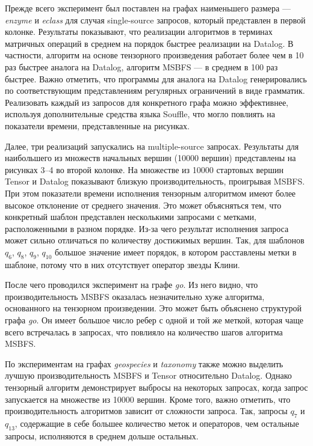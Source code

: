 Прежде всего эксперимент был поставлен на графах наименьшего размера --- \textit{enzyme} и \textit{eclass} для случая single-source запросов, который представлен в первой колонке. Результаты показывают, что реализации алгоритмов в терминах матричных операций в среднем на порядок быстрее реализации на Datalog. В частности, алгоритм на основе тензорного произведения работает более чем в 10 раз быстрее аналога на Datalog, алгоритм MSBFS --- в среднем в 100 раз быстрее. Важно отметить, что программы для аналога на Datalog генерировались по соответствующим представлениям регулярных ограничений в виде грамматик. Реализовать каждый из запросов для конкретного графа можно эффективнее, используя дополнительные средства языка Souffle, что могло повлиять на показатели времени, представленные на рисунках.

Далее, три реализаций запускались на multiple-source запросах. Результаты для наибольшего из множеств начальных вершин (10000 вершин) представлены на рисунках 3--4 во второй колонке. На множестве из 10000 стартовых вершин Tensor и Datalog показывают близкую производительность, проигрывая MSBFS. При этом показатели времени исполнения тензорным алгоритмом имеют более высокое отклонение от среднего значения. Это может объясняться тем, что конкретный шаблон представлен несколькими запросами с метками, расположенными в разном порядке. Из-за чего результат исполнения запроса может сильно отличаться по количеству достижимых вершин. Так, для шаблонов $q_6$, $q_8$, $q_9$, $q_{10}$ большое значение имеет порядок, в котором расставлены метки в шаблоне, потому что в них отсутствует оператор звезды Клини.

После чего проводился эксперимент на графе \textit{go}. Из него видно, что производительность MSBFS оказалась незначительно хуже алгоритма, основанного на тензорном произведении. Это может быть объяснено структурой графа \textit{go}. Он имеет большое число ребер с одной и той же меткой, которая чаще всего встречалась в запросах, что повлияло на количество шагов алгоритма MSBFS.

По экспериментам на графах \textit{geospecies} и \textit{taxonomy} также можно выделить лучшую производительность MSBFS и Tensor относительно Datalog. Однако тензорный алгоритм демонстрирует выбросы на некоторых запросах, когда запрос запускается на множестве из 10000 вершин. Кроме того, важно отметить, что производительность алгоритмов зависит от сложности запроса. Так, запросы $q_7$ и $q_{13}$, содержащие в себе большее количество меток и операторов, чем остальные запросы, исполняются в среднем дольше остальных.

